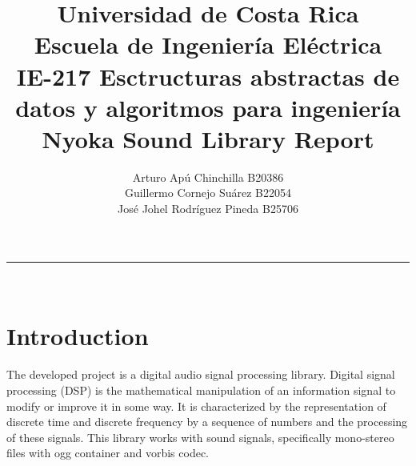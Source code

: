 \documentclass[letterpaper]{article}
\title{Universidad de Costa Rica \\ Escuela de Ingeniería Eléctrica \\ IE-217 Esctructuras abstractas de datos y algoritmos para ingeniería \\ Nyoka Sound Library Report}
\author{Arturo Apú Chinchilla B20386 \\ Guillermo Cornejo Suárez B22054 \\ José Johel Rodríguez Pineda B25706}
\begin{document}
\maketitle

\begin{center}
\rule{\textwidth}{0.8 pt} \\ [10 pt]
\end{center} 

\section{Introduction}

The developed project is a digital audio signal processing library. Digital signal processing (DSP) is the mathematical manipulation of an information signal to modify or improve it in some way. It is characterized by the representation of discrete time and discrete frequency by a sequence of numbers and the processing of these signals. This library works with sound signals, specifically mono-stereo files with ogg container and vorbis codec. 
\end{document}
